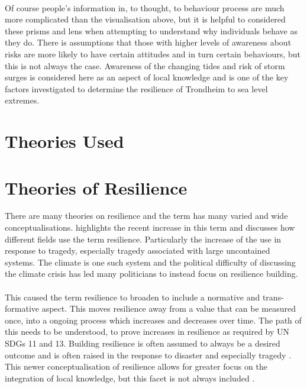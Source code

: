 \paragraph{}
Of course people's information in, to thought, to behaviour process are much more complicated than the visualisation above, but it is helpful to considered these prisms and lens when attempting to understand why individuals behave as they do. There is assumptions that those with higher levels of awareness about risks are more likely to have certain attitudes and in turn certain behaviours, but this is not always the case. \cite{lujala_climate_2015}  Awareness of the changing tides and risk of storm surges is considered here as an aspect of local knowledge and is one of the key factors investigated to determine the resilience of Trondheim to sea level extremes. 

\section{Theories Used}


\section{Theories of Resilience }

There are many theories on resilience and the term has many varied and wide conceptualisations. \cite{moser_turbulent_2019} highlights the recent increase in this term and discusses how different fields use the term resilience. Particularly the increase of the use in response to tragedy, especially tragedy associated with large uncontained systems. The climate is one such system and the political difficulty of discussing the climate crisis has led many politicians to instead focus on resilience building. 
\paragraph{}

This caused the term resilience to broaden to include a normative and trans-formative aspect.  This moves resilience away from a value that can be measured once, into a ongoing process which increases and decreases over time. The path of this needs to be understood, to prove increases in resilience as required by UN SDGs 11 and 13. Building resilience is often assumed to always be a desired outcome and is often raised in the response to disaster and especially tragedy \cite{moser_turbulent_2019}. This newer conceptualisation of resilience allows for greater focus on the integration of local knowledge, but this facet is not always included \cite{moser_turbulent_2019}.
